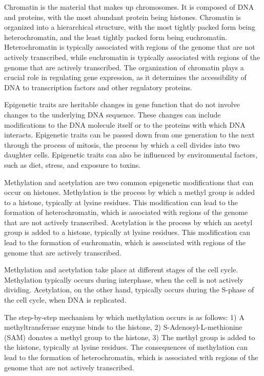 \begin{itemize}
\begin{itemize}
Chromatin is the material that makes up chromosomes. It is composed of DNA and proteins, with the most abundant protein being histones. Chromatin is organized into a hierarchical structure, with the most tightly packed form being heterochromatin, and the least tightly packed form being euchromatin. Heterochromatin is typically associated with regions of the genome that are not actively transcribed, while euchromatin is typically associated with regions of the genome that are actively transcribed. The organization of chromatin plays a crucial role in regulating gene expression, as it determines the accessibility of DNA to transcription factors and other regulatory proteins.

Epigenetic traits are heritable changes in gene function that do not involve changes to the underlying DNA sequence. These changes can include modifications to the DNA molecule itself or to the proteins with which DNA interacts. Epigenetic traits can be passed down from one generation to the next through the process of mitosis, the process by which a cell divides into two daughter cells. Epigenetic traits can also be influenced by environmental factors, such as diet, stress, and exposure to toxins.

Methylation and acetylation are two common epigenetic modifications that can occur on histones. Methylation is the process by which a methyl group is added to a histone, typically at lysine residues. This modification can lead to the formation of heterochromatin, which is associated with regions of the genome that are not actively transcribed. Acetylation is the process by which an acetyl group is added to a histone, typically at lysine residues. This modification can lead to the formation of euchromatin, which is associated with regions of the genome that are actively transcribed.

Methylation and acetylation take place at different stages of the cell cycle. Methylation typically occurs during interphase, when the cell is not actively dividing. Acetylation, on the other hand, typically occurs during the S-phase of the cell cycle, when DNA is replicated.

The step-by-step mechanism by which methylation occurs is as follows: 1) A methyltransferase enzyme binds to the histone, 2) S-Adenosyl-L-methionine (SAM) donates a methyl group to the histone, 3) The methyl group is added to the histone, typically at lysine residues. The consequences of methylation can lead to the formation of heterochromatin, which is associated with regions of the genome that are not actively transcribed.


\end{itemize}
\end{itemize}
